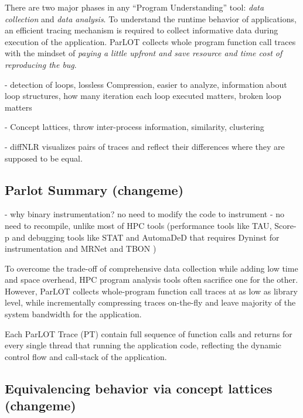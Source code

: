 There are two major phases in any ``Program Understanding'' tool: \textit{data collection} and \textit{data analysis}.
%
To understand the runtime behavior of applications, an efficient tracing mechanism is required to collect informative data during execution of the application.
%
ParLOT collects whole program function call traces with the mindset of \textit{paying a little upfront and save resource and time cost of reproducing the bug}.

- detection of loops, lossless Compression, easier to analyze, information about loop structures, how many iteration each loop executed matters, broken loop matters

- Concept lattices, throw inter-process information, similarity, clustering

- diffNLR visualizes pairs of traces and reflect their differences where they are supposed to be equal. 



\subsection{Parlot Summary (changeme)}

- why binary instrumentation? no need to modify the code to instrument - no need to recompile, unlike most of HPC tools (performance tools like TAU\cite{tau}, Score-p\cite{scorep} and debugging tools like STAT\cite{stat} and AutomaDeD\cite{automaded-laguna} that requires Dyninst\cite{dyninst} for instrumentation and MRNet\cite{mrnet} and TBON \cite{tbon})

To overcome the trade-off of comprehensive data collection while adding low time and space overhead, HPC program analysis tools often sacrifice one for the other. However, ParLOT collects whole-program function call traces at as low as library level, while incrementally compressing traces on-the-fly and leave majority of the system bandwidth for the application. 

Each ParLOT Trace (PT) contain full sequence of function calls and returns for every single thread that running the application code, reflecting the dynamic control flow and call-stack of the application.


 
\subsection{Equivalencing behavior via concept lattices (changeme)}


